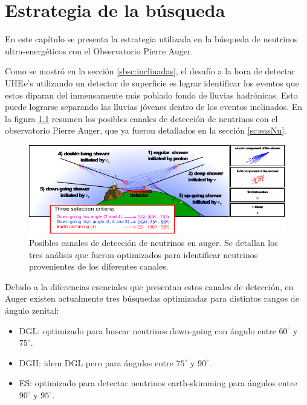 \chapter{Estrategia de la búsqueda}
\label{ch:estrategiaAuger}

En este capítulo se presenta la estrategia utilizada en la búsqueda de neutrinos ultra-energéticos con el Observatorio Pierre Auger.

Como se mostró en la sección \ref{sbsc:inclinadas}, el desafío a la hora de detectar UHE$\nu$'s utilizando un detector de superficie es lograr identificar los eventos que estos diparan del inmensamente más poblado fondo de lluvias hadrónicas.
Esto puede lograrse separando las lluvias jóvenes dentro de los eventos inclinados.
En la figura \ref{fig:augerNu} resumen los posibles canales de detección de neutrinos con el observatorio Pierre Auger, que ya fueron detallados en la sección \ref{sc:easNu}.
	\begin{figure}[ht!]
		\centering
		\includegraphics[width=\textwidth]{./fig/estrategiaAuger/auger_nu}
		\caption{\label{fig:augerNu}
		Posibles canales de detección de neutrinos en auger. Se detallan los tres análisis que fueron optimizados para identificar neutrinos provenientes de los diferentes canales.
		}
	\end{figure}
Debido a la diferencias esenciales que presentan estos canales de detección, en Auger existen actualmente tres búsquedas optimizadas para distintos rangos de ángulo zenital:
\begin{itemize}
 \item DGL: optimizado para buscar neutrinos down-going con ángulo entre $60^\circ$ y $75^\circ$.
 \item DGH: idem DGL pero para ángulos entre $75^\circ$ y $90^\circ$. 
 \item ES: optimizado para detectar neutrinos earth-skimming para ángulos entre $90^\circ$ y $95^\circ$.
\end{itemize}

